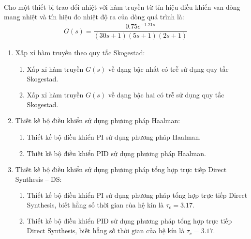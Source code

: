 \begin{exercise}
    Cho một thiết bị trao đổi nhiệt với hàm truyền từ tín hiệu điều khiển van dòng mang nhiệt và tín hiệu đo nhiệt độ ra của dòng quá trình là:
        \begin{align*}
            G(s) = \dfrac{0.75e^{-1.21s}}{(30s + 1)(5s + 1)(2s+1)}
        \end{align*}
    \begin{enumerate}
        \item Xấp xỉ hàm truyền theo quy tắc Skogestad:
            \begin{enumerate}
                \item Xấp xỉ hàm truyền $G(s)$ về dạng bậc nhất có trễ sử dụng quy tắc Skogestad.
                \item Xấp xỉ hàm truyền $G(s)$ về dạng bậc hai có trễ sử dụng quy tắc Skogestad.
            \end{enumerate}

        \item Thiết kế bộ điều khiển sử dụng phương pháp Haalman:
            \begin{enumerate}
                \item Thiết kế bộ điều khiển PI sử dụng phương pháp Haalman.
                \item Thiết kế bộ điều khiển PID sử dụng phương pháp Haalman.
            \end{enumerate}

        \item Thiết kế bộ điều khiển sử dụng phương pháp tổng hợp trực tiếp Direct Synthesis -- DS:
            \begin{enumerate}
                \item Thiết kế bộ điều khiển PI sử dụng phương pháp tổng hợp trực tiếp Direct Synthesis, biết hằng số thời gian của hệ kín là $\tau_c = 3.17$.

                \item Thiết kế bộ điều khiển PID sử dụng phương pháp tổng hợp trực tiếp Direct Synthesis, biết hằng số thời gian của hệ kín là $\tau_c = 3.17$.
            \end{enumerate}
    \end{enumerate}
\end{exercise}

